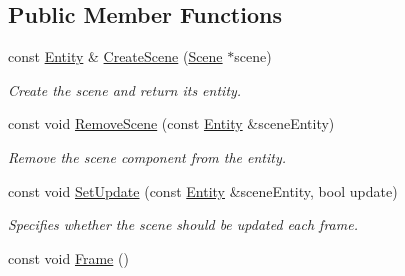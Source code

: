 \subsection*{Public Member Functions}
\begin{DoxyCompactItemize}
\item 
const \hyperlink{struct_ensum_1_1_components_1_1_entity}{Entity} \& \hyperlink{class_ensum_1_1_components_1_1_scene_manager_a4a71bb9192da118a71f1b81ca49742cb}{Create\+Scene} (\hyperlink{class_ensum_1_1_components_1_1_scene}{Scene} $\ast$scene)\hypertarget{class_ensum_1_1_components_1_1_scene_manager_a4a71bb9192da118a71f1b81ca49742cb}{}\label{class_ensum_1_1_components_1_1_scene_manager_a4a71bb9192da118a71f1b81ca49742cb}

\begin{DoxyCompactList}\small\item\em Create the scene and return it\textquotesingle{}s entity. \end{DoxyCompactList}\item 
const void \hyperlink{class_ensum_1_1_components_1_1_scene_manager_ab970d3716b08c39b9b8c5484dea11595}{Remove\+Scene} (const \hyperlink{struct_ensum_1_1_components_1_1_entity}{Entity} \&scene\+Entity)\hypertarget{class_ensum_1_1_components_1_1_scene_manager_ab970d3716b08c39b9b8c5484dea11595}{}\label{class_ensum_1_1_components_1_1_scene_manager_ab970d3716b08c39b9b8c5484dea11595}

\begin{DoxyCompactList}\small\item\em Remove the scene component from the entity. \end{DoxyCompactList}\item 
const void \hyperlink{class_ensum_1_1_components_1_1_scene_manager_aea9f13488931b4448778e5563685428e}{Set\+Update} (const \hyperlink{struct_ensum_1_1_components_1_1_entity}{Entity} \&scene\+Entity, bool update)\hypertarget{class_ensum_1_1_components_1_1_scene_manager_aea9f13488931b4448778e5563685428e}{}\label{class_ensum_1_1_components_1_1_scene_manager_aea9f13488931b4448778e5563685428e}

\begin{DoxyCompactList}\small\item\em Specifies whether the scene should be updated each frame. \end{DoxyCompactList}\item 
const void \hyperlink{class_ensum_1_1_components_1_1_scene_manager_ad33a35aa27eeae297a4f16c610205d8a}{Frame} ()\hypertarget{class_ensum_1_1_components_1_1_scene_manager_ad33a35aa27eeae297a4f16c610205d8a}{}\label{class_ensum_1_1_components_1_1_scene_manager_ad33a35aa27eeae297a4f16c610205d8a}


\end{DoxyCompactItemize}
